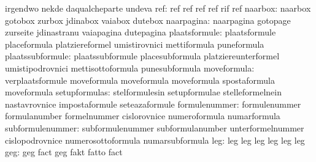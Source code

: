                                   irgendwo                         nekde
                                  daqualcheparte                   undeva
                             ref: ref                              ref
                                  ref                              ref
                                  rif                              ref
                         naarbox: naarbox                          gotobox
                                  zurbox                           jdinabox
                                  vaiabox                          dutebox  %
                      naarpagina: naarpagina                       gotopage
                                  zurseite                         jdinastranu
                                  vaiapagina                       dutepagina
                   plaatsformule: plaatsformule                    placeformula
                                  platziereformel                  umistirovnici
                                  mettiformula                     puneformula
                plaatssubformule: plaatssubformule                 placesubformula
                                  platziereunterformel             umistipodrovnici
                                  mettisottoformula                punesubformula
moveformula: verplaatsformule  moveformula
             moveformula       moveformula
             spostaformula       moveformula
                   setupformulas: stelformulesin                   setupformulae
                                  stelleformelnein                 nastavrovnice
                                  impostaformule                   seteazaformule
                   formulenummer: formulenummer                    formulanumber
                                  formelnummer                     cislorovnice
                                  numeroformula                    numarformula
                subformulenummer: subformulenummer                 subformulanumber
                                  unterformelnummer                cislopodrovnice
                                  numerosottoformula               numarsubformula
                             leg: leg                              leg
                                  leg                              leg
                                  leg                              leg
                             geg: geg                              fact
                                  geg                              fakt
                                  fatto                            fact

